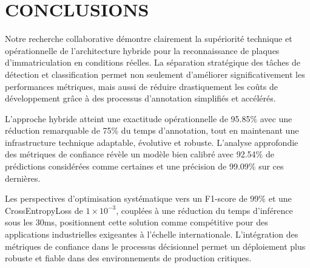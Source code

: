 \documentclass[letterpaper, 10 pt, conference]{ieeeconf}
\begin{document}
\section{CONCLUSIONS}

Notre recherche collaborative démontre clairement la supériorité technique et opérationnelle de l'architecture hybride pour la reconnaissance de plaques d'immatriculation en conditions réelles. La séparation stratégique des tâches de détection et classification permet non seulement d'améliorer significativement les performances métriques, mais aussi de réduire drastiquement les coûts de développement grâce à des processus d'annotation simplifiés et accélérés.

L'approche hybride atteint une exactitude opérationnelle de 95.85\% avec une réduction remarquable de 75\% du temps d'annotation, tout en maintenant une infrastructure technique adaptable, évolutive et robuste. L'analyse approfondie des métriques de confiance révèle un modèle bien calibré avec 92.54\% de prédictions considérées comme certaines et une précision de 99.09\% sur ces dernières.

Les perspectives d'optimisation systématique vers un F1-score de 99\% et une CrossEntropyLoss de $1 \times 10^{-3}$, couplées à une réduction du temps d'inférence sous les 30ms, positionnent cette solution comme compétitive pour des applications industrielles exigeantes à l'échelle internationale. L'intégration des métriques de confiance dans le processus décisionnel permet un déploiement plus robuste et fiable dans des environnements de production critiques.

\addtolength{\textheight}{-12cm}
\end{document}
